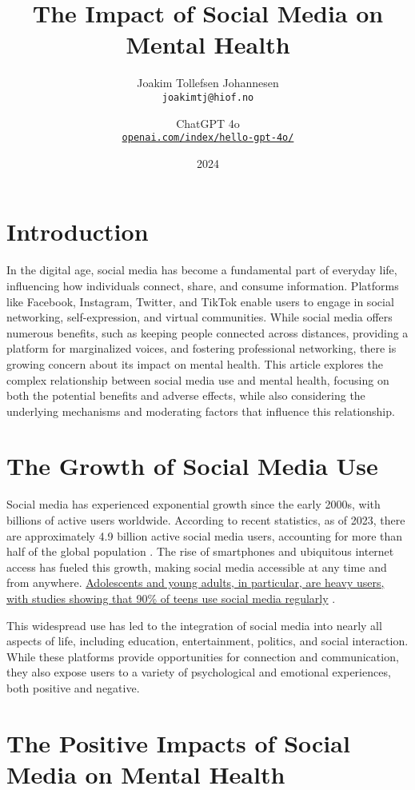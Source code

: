 \documentclass[12pt]{article}
\title{The Impact of Social Media on Mental Health}
\author{
    Joakim Tollefsen Johannesen\\
    \texttt{joakimtj@hiof.no}
    \and ChatGPT 4o\\
    \texttt{\href{https://openai.com/index/hello-gpt-4o/}{openai.com/index/hello-gpt-4o/}}
}
\date{2024}
\begin{document}

\maketitle
\tableofcontents
\section{Introduction}

In the digital age, social media has become a fundamental part of everyday life, influencing how individuals connect, share, and consume information. Platforms like Facebook, Instagram, Twitter, and TikTok enable users to engage in social networking, self-expression, and virtual communities. While social media offers numerous benefits, such as keeping people connected across distances, providing a platform for marginalized voices, and fostering professional networking, there is growing concern about its impact on mental health. This article explores the complex relationship between social media use and mental health, focusing on both the potential benefits and adverse effects, while also considering the underlying mechanisms and moderating factors that influence this relationship.

\section{The Growth of Social Media Use}

Social media has experienced exponential growth since the early 2000s, with billions of active users worldwide. According to recent statistics, as of 2023, there are approximately 4.9 billion active social media users, accounting for more than half of the global population \cite{statista2023}. The rise of smartphones and ubiquitous internet access has fueled this growth, making social media accessible at any time and from anywhere. \ul{Adolescents and young adults, in particular, are heavy users, with studies showing that 90\% of teens use social media regularly} \cite{smith2018}.

This widespread use has led to the integration of social media into nearly all aspects of life, including education, entertainment, politics, and social interaction. While these platforms provide opportunities for connection and communication, they also expose users to a variety of psychological and emotional experiences, both positive and negative.

\section{The Positive Impacts of Social Media on Mental Health}
\end{document}
